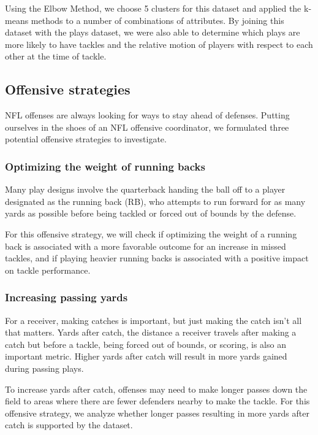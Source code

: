 \documentclass[bibtex, sigconf, hyperref={colorlinks=true,linkcolor=blue,urlcolor=blue}]{acmart}
\begin{document}
Using the Elbow Method, we choose 5 clusters for this dataset and applied the
k-means methods to a number of combinations of attributes. By joining this
dataset with the plays dataset, we were also able to determine which plays are
more likely to have tackles and the relative motion of players with respect to
each other at the time of tackle.

\subsection{Offensive strategies}

NFL offenses are always looking for ways to stay ahead of defenses. Putting
ourselves in the shoes of an NFL offensive coordinator, we formulated three
potential offensive strategies to investigate.

\subsubsection{Optimizing the weight of running backs}

Many play designs involve the quarterback handing the ball off to a player
designated as the running back (RB), who attempts to run forward for as many
yards as possible before being tackled or forced out of bounds by the defense.

For this offensive strategy, we will check if optimizing the weight of a running
back is associated with a more favorable outcome for an increase in missed
tackles, and if playing heavier running backs is associated with a positive
impact on tackle performance.

\subsubsection{Increasing passing yards}

For a receiver, making catches is important, but just making the catch isn't all
that matters. Yards after catch, the distance a receiver travels after making a
catch but before a tackle, being forced out of bounds, or scoring, is also an
important metric. Higher yards after catch will result in more yards gained
during passing plays.

To increase yards after catch, offenses may need to make longer passes down the
field to areas where there are fewer defenders nearby to make the tackle. For
this offensive strategy, we analyze whether longer passes resulting in more yards
after catch is supported by the dataset.
\end{document}
